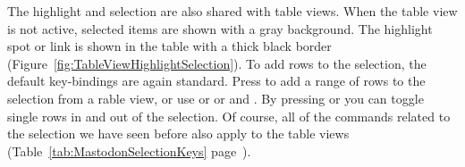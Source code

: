 The highlight and selection are also shared with table views. 
When the table view is not active, selected items are shown with a gray background.
The highlight spot or link is shown in the table with a thick black border (Figure~\ref{fig:TableViewHighlightSelection}).
To add rows to the selection, the default key-bindings are again standard.
Press  to add a range of rows to the selection from a rable view, or use \keys{\shift+\arrowkeyup} or \keys{\shift+\arrowkeydown} or  and .
By pressing  or  you can toggle single rows in and out of the selection.
Of course, all of the commands related to the selection we have seen before also apply to the table views (Table~\ref{tab:MastodonSelectionKeys} page~\pageref{tab:MastodonSelectionKeys}).

